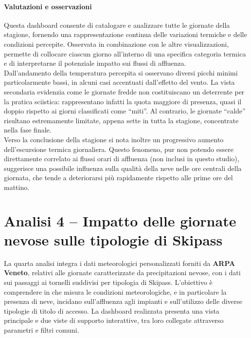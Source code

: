 \paragraph{Valutazioni e osservazioni}

Questa dashboard consente di catalogare e analizzare tutte le giornate della stagione, fornendo una rappresentazione continua delle variazioni termiche e delle condizioni percepite.  
Osservata in combinazione con le altre visualizzazioni, permette di collocare ciascun giorno all’interno di una specifica categoria termica e di interpretarne il potenziale impatto sui flussi di affluenza.\\

Dall’andamento della temperatura percepita si osservano diversi picchi minimi particolarmente bassi, in alcuni casi accentuati dall’effetto del vento.  
La vista secondaria evidenzia come le giornate fredde non costituiscano un deterrente per la pratica sciistica: rappresentano infatti la quota maggiore di presenza, quasi il doppio rispetto ai giorni classificati come “miti”.  
Al contrario, le giornate “calde” risultano estremamente limitate, appena sette in tutta la stagione, concentrate nella fase finale.\\

Verso la conclusione della stagione si nota inoltre un progressivo aumento dell’escursione termica giornaliera. Questo fenomeno, pur non potendo essere direttamente correlato ai flussi orari di affluenza (non inclusi in questo studio), suggerisce una possibile influenza sulla qualità della neve nelle ore centrali della giornata, che tende a deteriorarsi più rapidamente rispetto alle prime ore del mattino.



\section{Analisi 4 – Impatto delle giornate nevose sulle tipologie di Skipass}
\label{sec:analisi4}

La quarta analisi integra i dati meteorologici  personalizzati forniti da \textbf{ARPA Veneto}, relativi alle giornate caratterizzate da precipitazioni nevose, con i dati sui passaggi ai tornelli suddivisi per tipologia di Skipass.  
L’obiettivo  è comprendere in che misura le condizioni meteorologiche, e in particolare la presenza di neve, incidano sull’affluenza agli impianti e sull’utilizzo delle diverse tipologie di titolo di accesso.
La dashboard realizzata presenta una vista principale e due viste di supporto interattive, tra loro collegate attraverso parametri e filtri comuni.\\

